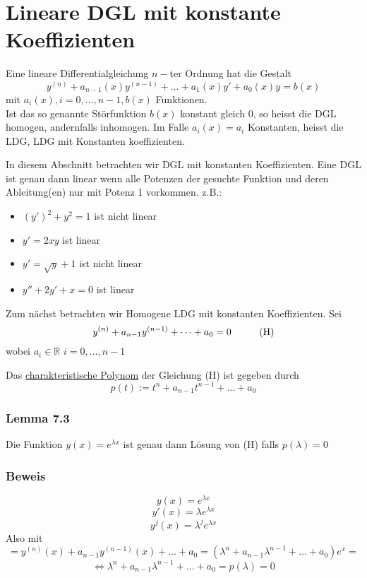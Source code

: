 \section{Lineare DGL mit konstante Koeffizienten} 

\begin{definition}{7.1}
Eine lineare Differentialgleichung $n-$ter Ordnung hat die Gestalt \[{y^{(n)}} + {a_{n - 1}}(x){y^{(n - 1)}} +  \ldots  + {a_1}(x)y' + {a_0}(x)y = b(x)\] mit $a_i(x),i=0,\dots,n-1, b(x)$ Funktionen. \\

Ist das so genannte Störfunktion $b(x)$ konstant gleich 0, so heisst die DGL homogen, andernfalls inhomogen. Im Falle $a_i(x)=a_i$ Konstanten, heisst die LDG, LDG mit Konstanten koeffizienten. 
\end{definition}

In diesem Abschnitt betrachten wir DGL mit konstanten Koeffizienten. Eine DGL ist genau dann linear wenn alle Potenzen der gesuchte Funktion und deren Ableitung(en) nur mit Potenz 1 vorkommen.
z.B.:
\begin{itemize}
\item $\left( y'\right)^2+y^2=1$ ist nicht linear
\item $y'=2xy$ ist linear
\item $y'=\sqrt{y}+1$ ist nicht linear
\item $y''+2y'+x=0$ ist linear
\end{itemize}

\noindent Zum nächst betrachten wir Homogene LDG mit konstanten Koeffizienten. Sei $$y^{(n)}+a_{n-1}y^{(n-1)}+\dots+a_0=0\text{\hspace{10mm}(H)}$$ wobei $a_i\in\mathbb{R}$ $i=0,\dots,n-1$
\begin{definition}{7.2}
Das \underline{charakteristische Polynom} der Gleichung (H) ist gegeben durch $$p(t):=t^n+a_{n-1}t^{n-1}+\dots+a_0$$
\end{definition} 
\subsubsection*{Lemma 7.3}
Die Funktion $y(x)=e^{\lambda x}$ ist genau dann Lösung von (H) falls $p(\lambda)=0$ 
\subsubsection*{Beweis}
$$y(x)=e^{\lambda x}$$
$$y'(x)=\lambda e^{\lambda x}$$
$$y^j(x)=\lambda ^je^{\lambda x}$$
Also mit $$=y^{(n)}(x)+a_{n-1}y^{(n-1)}(x)+\dots+a_0=(\lambda ^n+a_{n-1}\lambda ^{n-1}+\dots +a_0)e^x=$$
$$\Leftrightarrow \lambda^n+a_{n-1}\lambda^{n-1}+\dots +a_0=p(\lambda)=0$$

